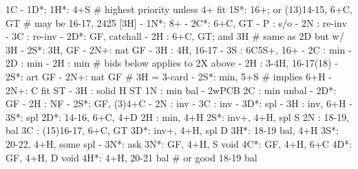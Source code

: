 1C - 1D*;
1H*: 4+S  # highest priority unless 4+ fit
1S*: 16+; or (13)14-15, 6+C, GT  # may be 16-17, 2425 [3H]
   - 1N*: 8+
        - 2C*: 6+C, GT
             - P  : s/o
             - 2N : re-inv
             - 3C : re-inv
        - 2D*: GF, catchall
        - 2H : 6+C, GT; and 3H  # same as 2D but w/ 3H
        - 2S*: 3H, GF
        - 2N+: nat GF
        - 3H : 4H, 16-17
        - 3S : 6C5S+, 16+
   - 2C : min
   - 2D : min
   - 2H : min
   # bids below applies to 2X above
        - 2H : 3-4H, 16-17(18)
        - 2S*: art GF
        - 2N+: nat GF  # 3H = 3-card
   - 2S*: min, 5+S  # implies 6+H
   - 2N+: C fit ST
   - 3H : solid H ST
1N : min bal
   - 2wPCB
2C : min unbal
   - 2D*: GF
   - 2H : NF
   - 2S*: GF, (3)4+C
   - 2N : inv
   - 3C : inv
   - 3D*: spl
   - 3H : inv, 6+H
   - 3S*: spl
2D*: 14-16, 6+C, 4+D
2H : min, 4+H
2S*: inv+, 4+H, spl S
2N : 18-19, bal
3C : (15)16-17, 6+C, GT
3D*: inv+, 4+H, spl D
3H*: 18-19 bal, 4+H
3S*: 20-22, 4+H, some spl
   - 3N*: ask
3N*: GF, 4+H, S void 
4C*: GF, 4+H, 6+C
4D*: GF, 4+H, D void 
4H*: 4+H, 20-21 bal  # or good 18-19 bal
